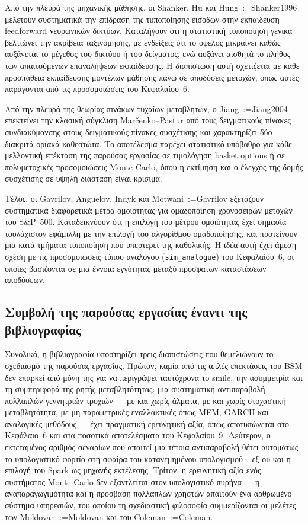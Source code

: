 \documentclass[12pt]{article}
\makeatletter
\newcommand{\citeyear}[1]{\@for\@tempa:=#1\do{\@ifundefined{cy@\@tempa}{(\@tempa)}{(\csname cy@\@tempa\endcsname)}}}
\makeatother
\begin{document}
Από την πλευρά της μηχανικής μάθησης, οι Shanker, Hu και Hung~\citeyear{Shanker1996} μελετούν συστηματικά την επίδραση της τυποποίησης εισόδων στην εκπαίδευση feedforward νευρωνικών δικτύων. Καταλήγουν ότι η στατιστική τυποποίηση γενικά βελτιώνει την ακρίβεια ταξινόμησης, με ενδείξεις ότι το όφελος μικραίνει καθώς αυξάνεται το μέγεθος του δικτύου ή του δείγματος, ενώ αυξάνει αισθητά το πλήθος των απαιτούμενων επαναλήψεων εκπαίδευσης. Η διαπίστωση αυτή σχετίζεται με κάθε προσπάθεια εκπαίδευσης μοντέλων μάθησης πάνω σε αποδόσεις μετοχών, όπως αυτές παράγονται από τις προσομοιώσεις του Κεφαλαίου~6.

Από την πλευρά της θεωρίας πινάκων τυχαίων μεταβλητών, ο Jiang~\citeyear{Jiang2004} επεκτείνει την κλασική σύγκλιση Marčenko--Pastur από τους δειγματικούς πίνακες συνδιακύμανσης στους δειγματικούς πίνακες συσχέτισης και χαρακτηρίζει δύο διακριτά οριακά καθεστώτα. Το αποτέλεσμα παρέχει στατιστικό υπόβαθρο για κάθε μελλοντική επέκταση της παρούσας εργασίας σε τιμολόγηση basket options ή σε πολυμετοχικές προσομοιώσεις Monte Carlo, όπου η εκτίμηση και ο έλεγχος της δομής συσχέτισης σε υψηλή διάσταση είναι κρίσιμα.

Τέλος, οι Gavrilov, Anguelov, Indyk και Motwani~\citeyear{Gavrilov} εξετάζουν συστηματικά διαφορετικά μέτρα ομοιότητας για ομαδοποίηση χρονοσειρών μετοχών του S\&P~500. Καταδεικνύουν ότι η επιλογή του μέτρου ομοιότητας έχει σημασία τουλάχιστον εφάμιλλη με την επιλογή του αλγορίθμου ομαδοποίησης, και προτείνουν μια κατά τμήματα τυποποίηση που υπερτερεί της καθολικής. Η ιδέα αυτή έχει άμεση σχέση με τις προσομοιώσεις τύπου αναλόγου (\texttt{sim\_analogue}) του Κεφαλαίου~6, οι οποίες βασίζονται σε μια έννοια εγγύτητας μεταξύ πρόσφατων καταστάσεων αποδόσεων.

\subsection{Συμβολή της παρούσας εργασίας έναντι της βιβλιογραφίας}
Συνολικά, η βιβλιογραφία υποστηρίζει τρεις διαπιστώσεις που θεμελιώνουν το σχεδιασμό της παρούσας εργασίας. Πρώτον, καμία από τις απλές επεκτάσεις του BSM δεν επαρκεί από μόνη της για να περιγράψει ταυτόχρονα το smile, την ασυμμετρία και τη συμπεριφορά της ρητής μεταβλητότητας: μια συστηματική αντιπαραβολή πολλαπλών γεννητριών τροχιών — με και χωρίς άλματα, με και χωρίς στοχαστική μεταβλητότητα, με μη παραμετρικές εναλλακτικές όπως MFM, GARCH και αναλογικές μεθόδους — έχει πραγματική ερευνητική αξία, όπως αποτυπώνεται στο Κεφάλαιο~6 και στα ποσοτικά αποτελέσματα του Κεφαλαίου~9. Δεύτερον, ο εκτεταμένος αριθμός σεναρίων που απαιτεί μια τέτοια αντιπαραβολή θέτει αυτομάτως το υπολογιστικό φορτίο στη σφαίρα του κατανεμημένου υπολογισμού· εξ ου και η επιλογή του Spark ως μηχανής εκτέλεσης. Τρίτον, η ερευνητική αξία ενός συστήματος Monte Carlo δεν εξαντλείται στον υπολογιστικό πυρήνα — η αναπαραγωγιμότητα και η πρόσβαση πολλαπλών χρηστών απαιτούν ένα αρθρωμένο σύστημα υπηρεσιών, του οποίου τη σχεδιαστική φιλοσοφία συμμερίζονται οι μελέτες των Moldovan~\citeyear{Moldovan} και του Coleman~\citeyear{Coleman}.
\end{document}
